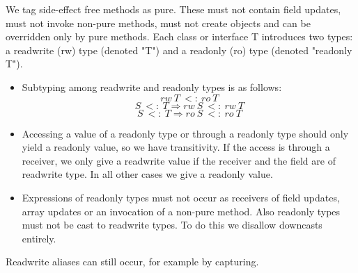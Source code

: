 \begin{mytitle} We tag side-effect free methods as pure. These must not contain field updates, must not invoke non-pure methods, must not create objects and can be overridden only by pure methods. Each class or interface T introduces two types: a readwrite (rw) type (denoted "T") and a readonly (ro) type (denoted "readonly T"). 
\begin{itemize}
    \item Subtyping among readwrite and readonly types is as follows: 
    $$rw\ T\ <:\ ro\ T$$
    $$ S\ <:\ T \Rightarrow rw\ S\ <:\ rw\ T$$
    $$ S\ <:\ T \Rightarrow ro\ S\ <:\ ro\ T$$
    \item Accessing a value of a readonly type or through a readonly type should only yield a readonly value, so we have transitivity. If the access is through a receiver, we only give a readwrite value if the receiver and the field are of readwrite type. In all other cases we give a readonly value. 
    \item Expressions of readonly types must not occur as receivers of field updates, array updates or an invocation of a non-pure method. Also readonly types must not be cast to readwrite types. To do this we disallow downcasts entirely.
\end{itemize}
Readwrite aliases can still occur, for example by capturing.
\end{mytitle}

